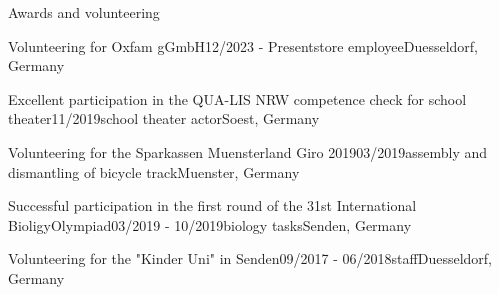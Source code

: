 \documentclass[
	11pt, %
]{src/resume} %
\begin{document}

\begin{rSection}{Awards and volunteering}

	\begin{rSubsection}{Volunteering for Oxfam gGmbH}{12/2023 - Present}{store employee}{Duesseldorf, Germany}
		\item[]
	\end{rSubsection}
	\begin{rSubsection}{Excellent participation in the QUA-LIS NRW competence check for school theater}{11/2019}{school theater actor}{Soest, Germany}
		\item[]
	\end{rSubsection}
	\begin{rSubsection}{Volunteering for the Sparkassen Muensterland Giro 2019}{03/2019}{assembly and dismantling of bicycle track}{Muenster, Germany}
		\item[]
	\end{rSubsection}
	\begin{rSubsection}{Successful participation in the first round of the 31st International BioligyOlympiad}{03/2019 - 10/2019}{biology tasks}{Senden, Germany}
		\item[]
	\end{rSubsection}
	\begin{rSubsection}{Volunteering for the "Kinder Uni" in Senden}{09/2017 - 06/2018}{staff}{Duesseldorf, Germany}
		\item[]
	\end{rSubsection}

\end{rSection}

\end{document}

